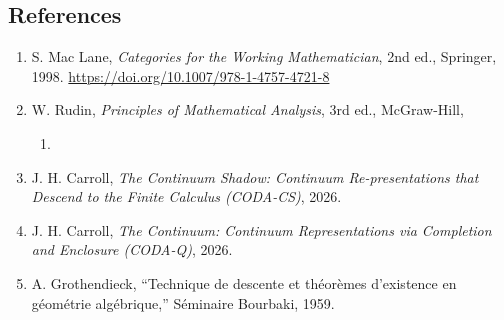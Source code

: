 \documentclass[
  11pt,
]{article}
\providecommand{\tightlist}{%
  \setlength{\itemsep}{0pt}\setlength{\parskip}{0pt}}
\begin{document}
\subsection{References}\label{references}

\begin{enumerate}
\def\labelenumi{\arabic{enumi}.}
\tightlist
\item
  S. Mac Lane, \emph{Categories for the Working Mathematician}, 2nd ed., Springer, 1998. \url{https://doi.org/10.1007/978-1-4757-4721-8}
\item
  W. Rudin, \emph{Principles of Mathematical Analysis}, 3rd ed., McGraw-Hill,

  \begin{enumerate}
  \def\labelenumii{\arabic{enumii}.}
  \setcounter{enumii}{1975}
  \tightlist
  \item
  \end{enumerate}
\item
  J. H. Carroll, \emph{The Continuum Shadow: Continuum Re-presentations that Descend to the Finite Calculus (CODA-CS)}, 2026.
\item
  J. H. Carroll, \emph{The Continuum: Continuum Representations via Completion and Enclosure (CODA-Q)}, 2026.
\item
  A. Grothendieck, ``Technique de descente et théorèmes d'existence en géométrie algébrique,'' Séminaire Bourbaki, 1959.
\end{enumerate}
\end{document}
